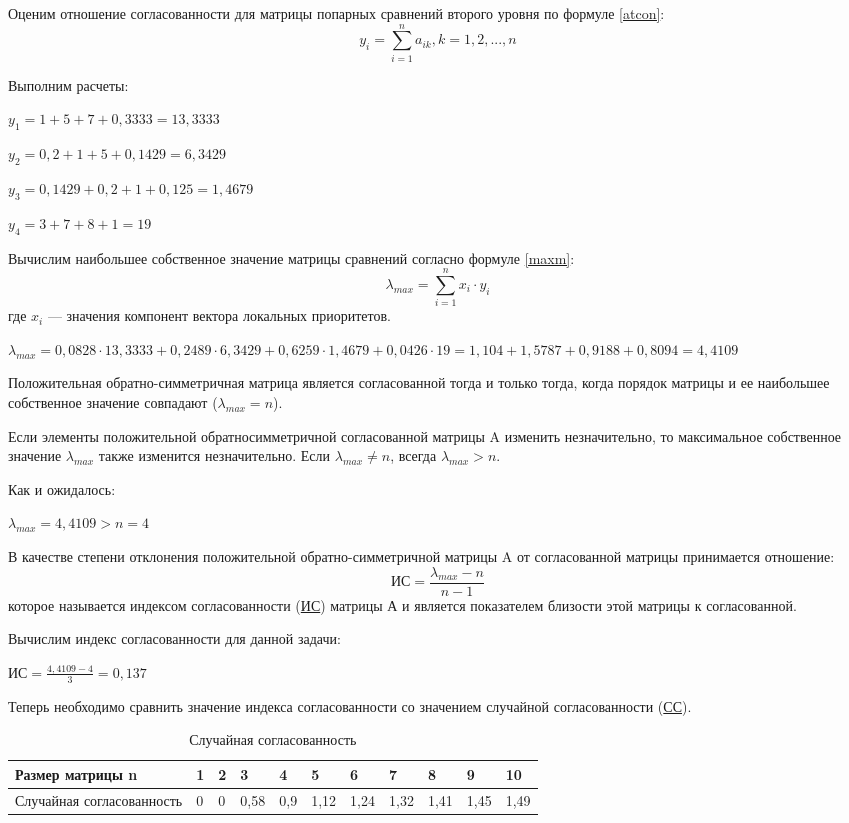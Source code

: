 Оценим отношение согласованности для матрицы попарных сравнений второго уровня по формуле \ref{atcon}:
\begin{equation}\label{atcon}
y_i = \sum_{i=1}^{n} a_{ik}, k = 1,2,...,n
\end{equation}

Выполним расчеты:

$y_1 = 1 + 5 + 7 + 0,3333 = 13,3333$

$y_2 = 0,2 + 1 + 5 + 0,1429 = 6,3429$

$y_3 = 0,1429 + 0,2 + 1 + 0,125 = 1,4679$

$y_4 = 3 + 7 + 8 + 1 = 19$

Вычислим наибольшее собственное значение матрицы сравнений согласно формуле \ref{maxm}:
\begin{equation}\label{maxm}
\lambda_{max} = \sum_{i=1}^{n} x_i \cdot y_i
\end{equation}
где $x_i$ --- значения компонент вектора локальных приоритетов.

$\lambda_{max} = 0,0828 \cdot 13,3333 + 0,2489 \cdot 6,3429 + 0,6259 \cdot 1,4679 + 0,0426 \cdot 19 = 1,104 + 1,5787 + 0,9188 + 0,8094  = 4,4109$

Положительная обратно-симметричная матрица является согласованной тогда и только тогда, когда порядок матрицы и ее наибольшее собственное значение совпадают ($\lambda_{max} = n$).

Если элементы положительной обратносимметричной согласованной матрицы A изменить незначительно, то максимальное собственное значение $\lambda_{max}$ также изменится незначительно.
Если $\lambda_{max} \neq n$, всегда $\lambda_{max} > n$.

Как и ожидалось:

$\lambda_{max} = 4,4109 > n = 4$

В качестве степени отклонения положительной обратно-симметричной матрицы A от согласованной матрицы принимается отношение:
\begin{equation}\label{icon}
\text{ИС} = \frac{\lambda_{max} - n}{n - 1}
\end{equation}
которое называется индексом согласованности (\hyperlink{is}{ИС}) матрицы А и является показателем близости этой матрицы к согласованной.

Вычислим индекс согласованности для данной задачи:

$\text{ИС} = \frac{4,4109 - 4}{3} = 0,137$

Теперь необходимо сравнить значение индекса согласованности со значением случайной согласованности (\hyperlink{ss}{СС}).
\begin{table}[H]
  \caption{Случайная согласованность}\label{randcon}
  \begin{tabular}{|p{4cm}|l|l|l|l|l|l|l|l|l|l|}
  \hline Размер матрицы n & 1 & 2 & 3 & 4 & 5 & 6 & 7 & 8 & 9 & 10 \\
  \hline Случайная согласованность & 0 & 0 & 0,58 & 0,9 & 1,12 & 1,24 & 1,32 & 1,41 & 1,45 & 1,49 \\
  \hline
  \end{tabular}
\end{table}

